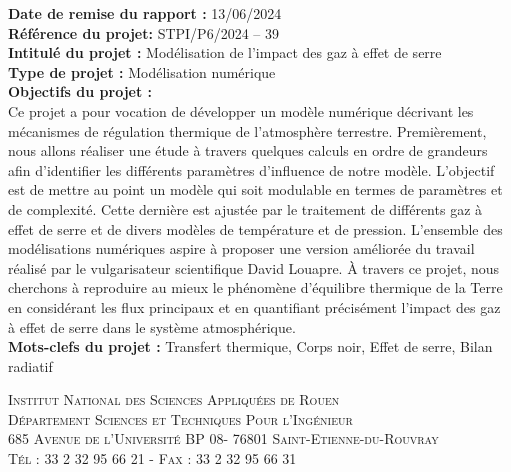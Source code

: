 \documentclass[a4paper, 12pt]{report} %
\begin{document}

\newpage
{}
\setcounter{page}{1}
\thispagestyle{empty}
\null


\newpage
\pagestyle{special}

\textbf{Date de remise du rapport :} 13/06/2024 \\

\textbf{Référence du projet:} STPI/P6/2024 – 39 \\

\textbf{Intitulé du projet :} Modélisation de l'impact des gaz à effet de serre \\

\textbf{Type de projet :} Modélisation numérique \\

\textbf{Objectifs du projet :} \\ 

Ce projet a pour vocation de développer un modèle numérique 
décrivant les mécanismes de régulation thermique de 
l'atmosphère terrestre. Premièrement, nous allons réaliser
une étude à travers quelques calculs en ordre de grandeurs afin
d'identifier les différents paramètres d'influence de notre modèle.
L'objectif est de mettre au point un modèle qui soit modulable
en termes de paramètres et de complexité. Cette dernière est 
ajustée par le traitement de différents gaz à effet de serre 
et de divers modèles de température et de pression. 
L'ensemble des modélisations numériques aspire à proposer 
une version améliorée du travail réalisé par le 
vulgarisateur scientifique David Louapre. À travers ce projet, 
nous cherchons à reproduire au mieux le 
phénomène d'équilibre thermique de la Terre en considérant 
les flux principaux et en quantifiant précisément l'impact
des gaz à effet de serre dans le système atmosphérique. \\

\textbf{Mots-clefs du projet :} Transfert thermique, Corps noir, Effet de serre, Bilan radiatif \\ 

\vfill


\begin{center}
	\scshape Institut National des Sciences Appliquées de Rouen \\
	Département Sciences et Techniques Pour l'Ingénieur \\
	685 Avenue de l'Université BP 08- 76801 Saint-Etienne-du-Rouvray \\ Tél : 33 2 32 95 66 21 - Fax : 33 2 32 95 66 31
\end{center}
\end{document}

